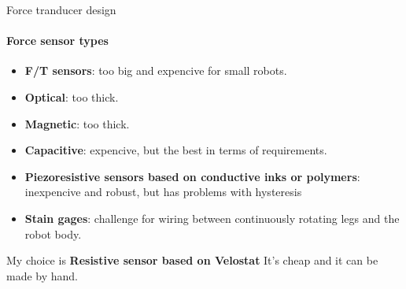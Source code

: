 \documentclass[aspectratio=169]{beamer}
\begin{document}
\begin{frame}[t]{Force tranducer design}
    \framesubtitle{Force sensor types}
    \vspace{-20pt}
    \begin{multicols}{2}
        \begin{itemize}
            \item \textbf{F/T sensors}: too big and expencive for small robots.
            \item \textbf{Optical}: too thick.
            \item \textbf{Magnetic}: too thick.
            \item \textbf{Capacitive}: expencive, but the best in terms of requirements.
            \item \textbf{Piezoresistive sensors
                      based on conductive inks or polymers}: inexpencive and robust, but has problems with hysteresis
            \item \textbf{Stain gages}: challenge for wiring between continuously rotating legs and the robot body.
        \end{itemize}
    \end{multicols}
    \vspace{-10pt}
    \begin{exampleblock}{My choice is \textbf{Resistive sensor based on Velostat}}
        It's cheap and it can be made by hand.
    \end{exampleblock}
\end{frame}
\end{document}
